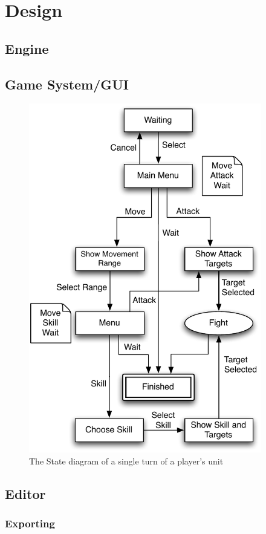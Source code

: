 \section{Design}

\subsection{Engine}

\subsection{Game System/GUI}


\begin{figure}[htbp]
	\centering
		\includegraphics[width=4in]{figures/unit.pdf}
	\caption{The State diagram of a single turn of a player's unit}
	\label{fig:figures_unit}
\end{figure}


\subsection{Editor}

\subsubsection{Exporting}

